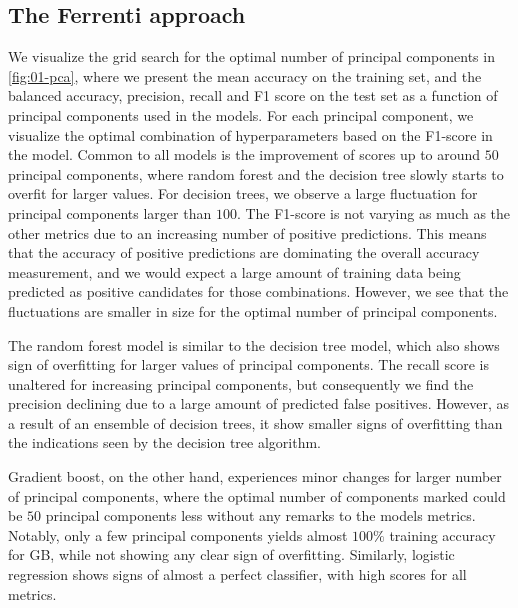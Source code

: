 \subsection{The Ferrenti approach}

We visualize the grid search for the optimal number of principal components in \autoref{fig:01-pca}, where we present the mean accuracy on the training set, and the balanced accuracy, precision, recall and F1 score on the test set as a function of principal components used in the models. For each principal component, we visualize the optimal combination of hyperparameters based on the F1-score in the model. Common to all models is the improvement of scores up to around $50$ principal components, where random forest and the decision tree slowly starts to overfit for larger values. For decision trees, we observe a large fluctuation for principal components larger than $100$. The F1-score is not varying as much as the other metrics due to an increasing number of positive predictions. This means that the accuracy of positive predictions are dominating the overall accuracy measurement, and we would expect a large amount of training data being predicted as positive candidates for those combinations. However, we see that the fluctuations are smaller in size for the optimal number of principal components.

The random forest model is similar to the decision tree model, which also shows sign of overfitting for larger values of principal components. The recall score is unaltered for increasing principal components, but consequently we find the precision declining due to a large amount of predicted false positives.  However, as a result of an ensemble of decision trees, it show smaller signs of overfitting than the indications seen by the decision tree algorithm.

Gradient boost, on the other hand, experiences minor changes for larger number of principal components, where the optimal number of components marked could be $50$ principal components less without any remarks to the models metrics. Notably, only a few principal components yields almost $100\%$ training accuracy for GB, while not showing any clear sign of overfitting. Similarly, logistic regression shows signs of almost a perfect classifier, with high scores for all metrics.

\clearpage

